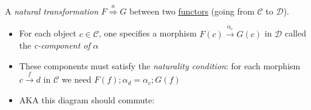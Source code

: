 A \emph{natural transformation} $F \overset{a}\Rightarrow G$ between two \href{doc/1 math/Seven Sketches in Compositionality/Chapter 3: Databases/3 Functors, natural transformations, and databases/2 Functors/1 Functor}{functors} (going from $\mathcal{C}$ to $\mathcal{D}$).

\begin{itemize}
    \item For each object $c \in \mathcal{C}$, one specifies a morphism $F(c)\xrightarrow{\alpha_c}G(c)$ in $\mathcal{D}$ called the \emph{c-component of} $\alpha$
    \item These components must satisfy the \emph{naturality condition}: for each morphism $c \xrightarrow{f} d$ in $\mathcal{C}$ we need $F(f);\alpha_d=\alpha_c;G(f)$
    \item AKA this diagram should commute: 
  \end{itemize}
